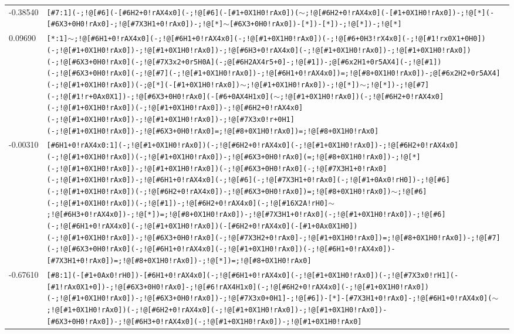 \begin{longtable}{>{\baselineskip=10pt}p{} >{\baselineskip=10pt}p{}}
-0.38540 & \texttt{[\#7:1](-;!@[\#6](-[\#6H2+0!rAX4x0](-;!@[\#6](-[\#1+0X1H0!rAx0])($\sim$;!@[\#6H2+0!rAX4x0](-[\#1+0X1H0!rAx0])-;!@[*](-[\#6X3+0H0!rAx0]-;!@[\#7X3H1+0!rAx0])-;!@[*]$\sim$[\#6X3+0H0!rAx0])-[*])-[*])-;!@[*])-;!@[*]} \\ 
0.09690 & \texttt{[*:1]$\sim$;!@[\#6H1+0!rAX4x0](-;!@[\#6H1+0!rAX4x0](-;!@[\#1+0X1H0!rAx0])(-;!@[\#6+0H3!rX4x0](-;!@[\#1!rx0X1+0H0])(-;!@[\#1+0X1H0!rAx0])-;!@[\#1+0X1H0!rAx0])-;!@[\#6H3+0!rAX4x0](-;!@[\#1+0X1H0!rAx0])-;!@[\#1+0X1H0!rAx0])(-;!@[\#6X3+0H0!rAx0](-;!@[\#7X3x2+0r5H0A](-;@[\#6H2AX4r5+0]-;!@[\#1])-;@[\#6x2H1+0r5AX4](-;!@[\#1])(-;!@[\#6X3+0H0!rAx0](-;!@[\#7](-;!@[\#1+0X1H0!rAx0])-;!@[\#6H1+0!rAX4x0])=;!@[\#8+0X1H0!rAx0])-;@[\#6x2H2+0r5AX4](-;!@[\#1+0X1H0!rAx0])(-;@[*](-[\#1+0X1H0!rAx0])$\sim$;!@[\#1+0X1H0!rAx0])-;!@[*])$\sim$;!@[*])-;!@[\#7](-;!@[\#1!r+0Ax0X1])-;!@[\#6X3+0H0!rAx0](-[\#6+0AX4H1x0]($\sim$;!@[\#1+0X1H0!rAx0])(-;!@[\#6H2+0!rAX4x0](-;!@[\#1+0X1H0!rAx0])(-;!@[\#1+0X1H0!rAx0])-;!@[\#6H2+0!rAX4x0](-;!@[\#1+0X1H0!rAx0])-;!@[\#1+0X1H0!rAx0])-;!@[\#7X3x0!r+0H1](-;!@[\#1+0X1H0!rAx0])-;!@[\#6X3+0H0!rAx0]=;!@[\#8+0X1H0!rAx0])=;!@[\#8+0X1H0!rAx0]} \\ 
-0.00310 & \texttt{[\#6H1+0!rAX4x0:1](-;!@[\#1+0X1H0!rAx0])(-;!@[\#6H2+0!rAX4x0](-;!@[\#1+0X1H0!rAx0])-;!@[\#6H2+0!rAX4x0](-;!@[\#1+0X1H0!rAx0])(-;!@[\#1+0X1H0!rAx0])-;!@[\#6X3+0H0!rAx0](=;!@[\#8+0X1H0!rAx0])-;!@[*](-;!@[\#1+0X1H0!rAx0])-;!@[\#1+0X1H0!rAx0])(-;!@[\#6X3+0H0!rAx0](-;!@[\#7X3H1+0!rAx0](-;!@[\#1+0X1H0!rAx0])-;!@[\#6H1+0!rAX4x0](-;!@[\#6](-;!@[\#7X3H1+0!rAx0](-;!@[\#1+0Ax0!rH0])-;!@[\#6](-;!@[\#1+0X1H0!rAx0])(-;!@[\#6H2+0!rAX4x0])-;!@[\#6X3+0H0!rAx0])=;!@[\#8+0X1H0!rAx0])$\sim$;!@[\#6](-;!@[\#1+0X1H0!rAx0])(-;!@[\#1])-;!@[\#6H2+0!rAX4x0](-;!@[\#16X2A!rH0]$\sim$;!@[\#6H3+0!rAX4x0])-;!@[*])=;!@[\#8+0X1H0!rAx0])-;!@[\#7X3H1+0!rAx0](-;!@[\#1+0X1H0!rAx0])-;!@[\#6](-;!@[\#6H1+0!rAX4x0](-;!@[\#1+0X1H0!rAx0])(-[\#6H2+0!rAX4x0](-[\#1+0Ax0X1H0])(-;!@[\#1+0X1H0!rAx0])-;!@[\#6X3+0H0!rAx0](-;!@[\#7X3H2+0!rAx0]-;!@[\#1+0X1H0!rAx0])=;!@[\#8+0X1H0!rAx0])-;!@[\#7](-;!@[\#6X3+0H0!rAx0](-;!@[\#6H1+0!rAX4x0](-;!@[\#1+0X1H0!rAx0])(-;!@[\#6H1+0!rAX4x0])-[\#7X3H1+0!rAx0])=;!@[\#8+0X1H0!rAx0])-;!@[*])=;!@[\#8+0X1H0!rAx0]} \\ 
-0.67610 & \texttt{[\#8:1](-[\#1+0Ax0!rH0])-[\#6H1+0!rAX4x0](-;!@[\#6H1+0!rAX4x0](-;!@[\#1+0X1H0!rAx0])(-;!@[\#7X3x0!rH1](-[\#1!rAx0X1+0])-;!@[\#6X3+0H0!rAx0]-;!@[\#6!rAX4H1x0](-;!@[\#6H2+0!rAX4x0](-;!@[\#1+0X1H0!rAx0])(-;!@[\#1+0X1H0!rAx0])-;!@[\#6X3+0H0!rAx0])-;!@[\#7X3x0+0H1]-;!@[\#6])-[*]-[\#7X3H1+0!rAx0]-;!@[\#6H1+0!rAX4x0]($\sim$;!@[\#1+0X1H0!rAx0])(-;!@[\#6H2+0!rAX4x0](-;!@[\#1+0X1H0!rAx0])-;!@[\#1+0X1H0!rAx0])-[\#6X3+0H0!rAx0])-;!@[\#6H3+0!rAX4x0](-;!@[\#1+0X1H0!rAx0])-;!@[\#1+0X1H0!rAx0]} \\ 

\end{longtable}

